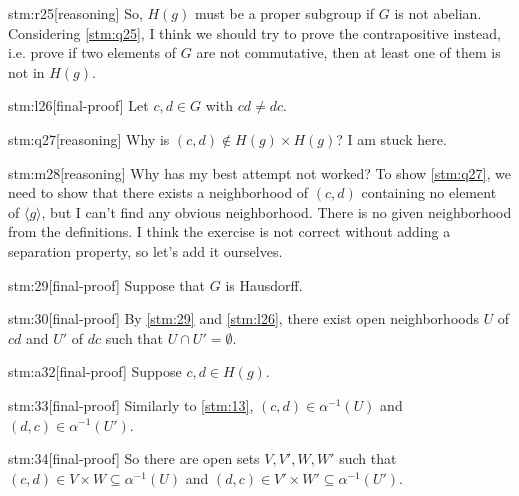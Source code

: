 \documentclass{article}
\begin{document}
\begin{stm}{stm:r25}[reasoning]
So, $H(g)$ must be a proper subgroup if $G$ is not abelian. Considering \ref{stm:q25}, I think we should try to prove the contrapositive instead, i.e. prove if two elements of $G$ are not commutative, then at least one of them is not in $H(g)$.
\end{stm}

\begin{stm}{stm:l26}[final-proof]
  Let $c, d \in G$ with $cd \ne dc$.
\end{stm}

\begin{stm}{stm:q27}[reasoning]
Why is $(c,d) \notin H(g) \times H(g)$? I am stuck here.
\end{stm}

\begin{stm}{stm:m28}[reasoning]
Why has my best attempt not worked? To show \ref{stm:q27}, we need to show that there exists a neighborhood of $(c,d)$ containing no element of ${\langle g \rangle}$, but I can't find any obvious neighborhood. There is no given neighborhood from the definitions. I think the exercise is not correct without adding a separation property, so let's add it ourselves.
\end{stm}

\begin{stm}{stm:29}[final-proof]
Suppose that $G$ is Hausdorff. 
\end{stm}

\begin{stm}{stm:30}[final-proof]
By \ref{stm:29} and \ref{stm:l26}, there exist open neighborhoods $U$ of $cd$ and $U'$ of $dc$ such that $U \cap U' = \emptyset$.
\end{stm}

\begin{stm}{stm:a32}[final-proof]
Suppose $c,d \in H(g)$.
\end{stm}

\begin{stm}{stm:33}[final-proof]
Similarly to \ref{stm:13}, $(c,d) \in \alpha^{-1}(U)$ and $(d,c) \in \alpha^{-1}(U')$.
\end{stm}

\begin{stm}{stm:34}[final-proof]
So there are open sets $V,V',W,W'$ such that $(c,d) \in V \times W \subseteq \alpha^{-1}(U)$ and $(d,c) \in V' \times W' \subseteq \alpha^{-1}(U')$.
\end{stm}
\end{document}
